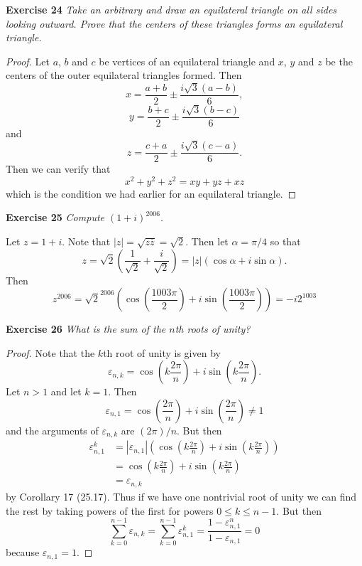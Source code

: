 \documentclass{article}
\begin{document}
\begin{flushleft}
\textbf{Exercise 24}
\textsl{Take an arbitrary and draw an equilateral triangle on all sides looking outward. Prove that the centers of these triangles forms an equilateral triangle.}
\begin{proof}
Let $a$, $b$ and $c$ be vertices of an equilateral triangle and $x$, $y$ and $z$ be the centers of the outer equilateral triangles formed. Then
\[
x = \frac{a+b}{2} \pm \frac{i \sqrt{3} (a-b)}{6},
\]
\[
y = \frac{b+c}{2} \pm \frac{i \sqrt{3} (b-c)}{6}
\]
and
\[
z = \frac{c+a}{2} \pm \frac{i \sqrt{3} (c-a)}{6}.
\]
Then we can verify that
\[
x^2 + y^2 + z^2 = xy + yz + xz
\]
which is the condition we had earlier for an equilateral triangle.
\end{proof}

\textbf{Exercise 25}
\textsl{Compute $(1+i)^{2006}$.}\newline

Let $z = 1+i$. Note that $|z| = \sqrt{z \overline{z}} = \sqrt{2}$. Then let $\alpha = \pi/4$ so that
\[
z = \sqrt{2} \left ( \frac{1}{\sqrt{2}} + \frac{i}{\sqrt{2}} \right ) = |z| (\cos \alpha + i \sin \alpha).
\]
Then
\[
z^{2006} = \sqrt{2}^{2006} \left ( \cos \left ( \frac{1003 \pi}{2} \right ) + i \sin \left ( \frac{1003 \pi}{2} \right ) \right ) = -i 2^{1003}\]

\textbf{Exercise 26}
\textsl{What is the sum of the $n$th roots of unity?}
\begin{proof}
Note that the $k$th root of unity is given by
\[
\varepsilon_{n,k} = \cos \left ( k \frac{2 \pi}{n} \right ) + i \sin \left ( k \frac{2 \pi}{n} \right ).
\]
Let $n > 1$ and let $k = 1$. Then
\[
\varepsilon_{n,1} = \cos \left (\frac{2 \pi}{n} \right ) + i \sin \left (\frac{2 \pi}{n} \right ) \neq 1
\]
and the arguments of $\varepsilon_{n,k}$ are $(2 \pi)/n$. But then
\begin{align*}
\varepsilon_{n,1}^k &= |\varepsilon_{n,1}| \left ( \cos \left ( k \frac{2 \pi}{n} \right ) + i \sin \left ( k \frac{2 \pi}{n} \right ) \right ) \\
			    &= \cos \left ( k \frac{2 \pi}{n} \right ) + i \sin \left ( k \frac{2 \pi}{n} \right ) \\
			    &= \varepsilon_{n,k}
\end{align*}
by Corollary 17 (25.17). Thus if we have one nontrivial root of unity we can find the rest by taking powers of the first for powers $0 \leq k \leq n-1$. But then
\[
\sum_{k=0}^{n-1} \varepsilon_{n,k} = \sum_{k=0}^{n-1} \varepsilon_{n,1}^k = \frac{1-\varepsilon_{n,1}^n}{1-\varepsilon_{n,1}} = 0
\]
because $\varepsilon_{n,1} = 1$.
\end{proof}


\end{flushleft}
\end{document}
